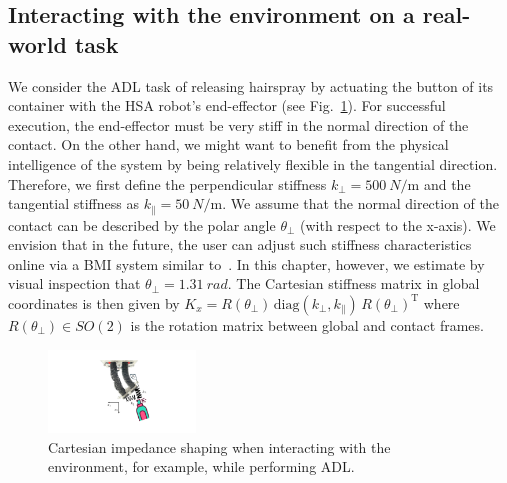 \subsection{Interacting with the environment on a real-world task}\label{sub:braincontrol:experiments:adl}
We consider the \gls{ADL} task of releasing hairspray by actuating the button of its container with the \gls{HSA} robot's end-effector (see Fig.~\ref{fig:braincontrol:cartesian_impedance_adl}). For successful execution, the end-effector must be very stiff in the normal direction of the contact. On the other hand, we might want to benefit from the physical intelligence of the system by being relatively flexible in the tangential direction. Therefore, we first define the perpendicular stiffness $k_\perp = \SI{500}{N\per\meter}$ and the tangential stiffness as $k_\parallel = \SI{50}{N \per \meter}$. We assume that the normal direction of the contact can be described by the polar angle $\theta_\perp$ (with respect to the x-axis). We envision that in the future, the user can adjust such stiffness characteristics online via a \gls{BMI} system similar to~\citep{schiatti2017soft}. In this chapter, however, we estimate by visual inspection that $\theta_\perp=\SI{1.31}{rad}$.
The Cartesian stiffness matrix in global coordinates is then given by $K_x = R(\theta_\perp) \, \mathrm{diag}(k_\perp, k_\parallel) \, R(\theta_\perp)^\mathrm{T}$
where $R(\theta_\perp) \in SO(2)$ is the rotation matrix between global and contact frames.

\begin{figure}[hbt]
    \centering
    \includegraphics[width=0.35\textwidth]{braincontrol/figures/adl_task/cartesian_impedance_adl_cropped.pdf}
    \caption{Cartesian impedance shaping when interacting with the environment, for example, while performing \gls{ADL}. }
    \label{fig:braincontrol:cartesian_impedance_adl}
\end{figure}

